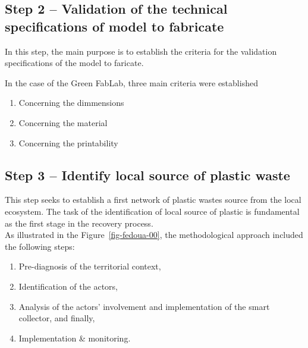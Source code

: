 \documentclass[
  11pt,
]{article}
\providecommand{\tightlist}{%
  \setlength{\itemsep}{0pt}\setlength{\parskip}{0pt}}\usepackage{longtable,booktabs,array}
\begin{document}
\hypertarget{step-2-validation-of-the-technical-specifications-of-model-to-fabricate}{%
\subsection{Step 2 -- Validation of the technical specifications of
model to
fabricate}\label{step-2-validation-of-the-technical-specifications-of-model-to-fabricate}}

In this step, the main purpose is to establish the criteria for the
validation specifications of the model to faricate.

In the case of the Green FabLab, three main criteria were established

\begin{enumerate}
\def\labelenumi{\arabic{enumi}.}
\tightlist
\item
  Concerning the dimmensions
\item
  Concerning the material
\item
  Concerning the printability
\end{enumerate}

\hypertarget{step-3-identify-local-source-of-plastic-waste}{%
\subsection{Step 3 -- Identify local source of plastic
waste}\label{step-3-identify-local-source-of-plastic-waste}}

This step seeks to establish a first network of plastic wastes source
from the local ecosystem. The task of the identification of local source
of plastic is fundamental as the first stage in the recovery process.\\
As illustrated in the Figure~\ref{fig-fedoua-00}, the methodological
approach included the following steps:

\begin{enumerate}
\def\labelenumi{\arabic{enumi}.}
\tightlist
\item
  Pre-diagnosis of the territorial context,
\item
  Identification of the actors,
\item
  Analysis of the actors' involvement and implementation of the smart
  collector, and finally,
\item
  Implementation \& monitoring.
\end{enumerate}
\end{document}
